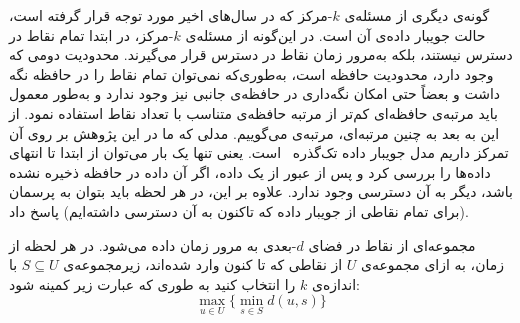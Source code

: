 گونه‌ی دیگری از مسئله‌ی $k$-مرکز که در سال‌های اخیر مورد توجه قرار گرفته است، حالت جویبار داده‌ی آن است.
در این‌گونه از مسئله‌ی $k$-مرکز، در ابتدا تمام نقاط در دسترس نیستند، بلکه به‌مرور زمان نقاط در دسترس قرار می‌گیرند.
محدودیت دومی که وجود دارد، محدودیت حافظه است، به‌طوری‌که نمی‌توان تمام نقاط را در حافظه نگه داشت و بعضاً حتی امکان نگه‌داری در حافظه‌ی جانبی نیز وجود ندارد و به‌طور معمول باید مرتبه‌ی حافظه‌ای کم‌تر از مرتبه حافظه‌ی  متناسب با تعداد نقاط استفاده نمود.
از این به بعد به چنین مرتبه‌ای، مرتبه‌ی  می‌گوییم.
مدلی که ما در این پژوهش بر روی آن تمرکز داریم مدل جویبار داده تک‌گذره~\cite{aggarwal2007data} است.
یعنی تنها یک بار می‌توان از ابتدا تا انتهای داده‌ها را بررسی کرد و پس از عبور از یک داده، اگر آن داده در حافظه ذخیره نشده باشد، دیگر به آن دسترسی وجود ندارد. علاوه بر این، در هر لحظه باید بتوان به پرسمان (برای تمام نقاطی از جویبار داده که تاکنون به آن دسترسی داشته‌ایم) پاسخ داد.


\begin{مسئله}
 مجموعه‌ای از نقاط در فضای $d$-بعدی به مرور زمان داده می‌شود.
در هر لحظه از زمان، به ازای مجموعه‌ی $U$ از نقاطی که تا کنون وارد شده‌اند،
زیرمجموعه‌ی $S \subseteq U$ با اندازه‌ی $k$ را انتخاب کنید به ‌طوری ‌که عبارت زیر کمینه شود:
\begin{equation}
\max_{u \in U} \{ \min_{s \in S} d(u, s) \}
\end{equation}
\end{مسئله}

